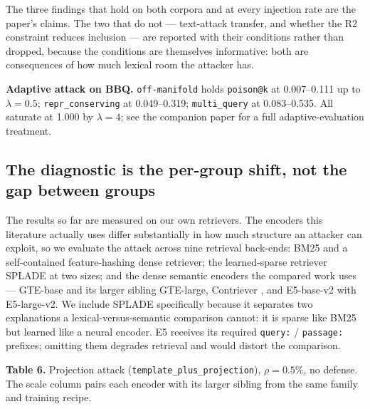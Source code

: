 \documentclass[authoryear,review,3p,times]{elsarticle}
\begin{document}
The three findings that hold on both corpora and at every injection rate are the paper's claims. The two that do not --- text-attack transfer, and whether the R2 constraint reduces inclusion --- are reported with their conditions rather than dropped, because the conditions are themselves informative: both are consequences of how much lexical room the attacker has.

\textbf{Adaptive attack on BBQ.} \texttt{off-manifold} holds \texttt{poison@k} at 0.007--0.111 up to \(\lambda = 0.5\); \texttt{repr\_conserving} at 0.049--0.319; \texttt{multi\_query} at 0.083--0.535. All saturate at 1.000 by \(\lambda = 4\); see the companion paper for a full adaptive-evaluation treatment.

\subsection{The diagnostic is the per-group shift, not the gap between groups}\label{encoder-robustness-a-per-checkpoint-property-not-a-family-property}

The results so far are measured on our own retrievers. The encoders this literature actually uses differ substantially in how much structure an attacker can exploit, so we evaluate the attack across nine retrieval back-ends: BM25 and a self-contained feature-hashing dense retriever; the learned-sparse retriever SPLADE at two sizes; and the dense semantic encoders the compared work uses --- GTE-base \citeauthor{zhao2026} and its larger sibling GTE-large, Contriever \citeauthor{kim2025b}, and E5-base-v2 \citeyearpar{wang2025,wu2025} with E5-large-v2. We include SPLADE specifically because it separates two explanations a lexical-versus-semantic comparison cannot: it is sparse like BM25 but learned like a neural encoder. E5 receives its required \texttt{query:} / \texttt{passage:} prefixes; omitting them degrades retrieval and would distort the comparison.

\textbf{Table 6.} Projection attack (\texttt{template\_plus\_projection}), \(\rho = 0.5\%\), no defense. The scale column pairs each encoder with its larger sibling from the same family and training recipe.
\end{document}
